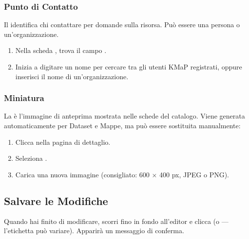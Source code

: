 \documentclass[letterpaper,10pt,english]{sphinxmanual}
\begin{document}
\subsubsection{Punto di Contatto}
\label{\detokenize{it/03_gestire_metadati:punto-di-contatto}}
\sphinxAtStartPar
Il  identifica chi contattare per domande sulla risorsa.
Può essere una persona o un’organizzazione.
\begin{enumerate}
%
\item {} 
\sphinxAtStartPar
Nella scheda , trova il campo .

\item {} 
\sphinxAtStartPar
Inizia a digitare un nome per cercare tra gli utenti KMaP registrati, oppure inserisci
il nome di un’organizzazione.

\end{enumerate}


\subsubsection{Miniatura}
\label{\detokenize{it/03_gestire_metadati:miniatura}}
\sphinxAtStartPar
La  è l’immagine di anteprima mostrata nelle schede del catalogo. Viene
generata automaticamente per Dataset e Mappe, ma può essere sostituita manualmente:
\begin{enumerate}
%
\item {} 
\sphinxAtStartPar
Clicca  nella pagina di dettaglio.

\item {} 
\sphinxAtStartPar
Seleziona .

\item {} 
\sphinxAtStartPar
Carica una nuova immagine (consigliato: 600 × 400 px, JPEG o PNG).

\end{enumerate}


\subsection{Salvare le Modifiche}
\label{\detokenize{it/03_gestire_metadati:salvare-le-modifiche}}
\sphinxAtStartPar
Quando hai finito di modificare, scorri fino in fondo all’editor e clicca 
(o  — l’etichetta può variare). Apparirà un messaggio di conferma.
\end{document}
